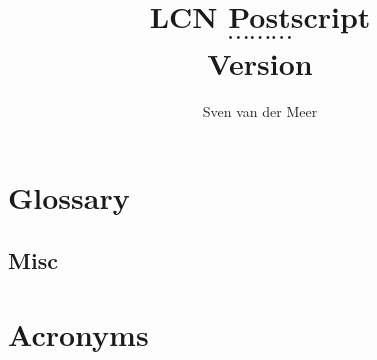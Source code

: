 \documentclass[a4paper,final,notitlepage,makeindex]{article}
\begin{document}
    \renewcommand*{\bibfont}{\citefont}
    \newcommand{\lcncite}[1]{{\citefont\cite{#1}}}

    \makeatletter
        \renewcommand{\figureautorefname}{Fig.\@gobble}
        \renewcommand{\sectionautorefname}{\S\@gobble}
        \renewcommand{\subsectionautorefname}{\S\@gobble}
        \renewcommand{\subsubsectionautorefname}{\S\@gobble}
    \makeatother

    \author{Sven van der Meer}
    \title{LCN Postscript \\ $\cdots \cdots \cdots$ \\ \small{Version }}
    \maketitle

    

    \begin{multicols}{2}
        \setcounter{tocdepth}{3}
        \tableofcontents
    \end{multicols}
    \newpage

    
    \newpage

    

    



    \section{Glossary}
        \subsection{Misc}
            

    

    


    


    

    \section{Acronyms}
        \begin{multicols}{2}
            \setlength{\columnseprule}{0pt}
            \footnotesize
            
        \end{multicols}

    \printbibliography[heading=bibintoc]

    \cleardoublepage
    \printindex
\end{document}
